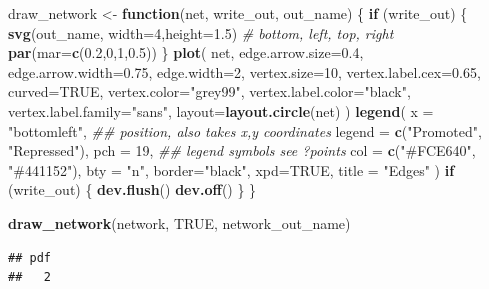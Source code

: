 \documentclass[
]{book}
\newenvironment{Shaded}{\begin{snugshade}}{\end{snugshade}}
\newcommand{\CommentTok}[1]{\textcolor[rgb]{0.56,0.35,0.01}{\textit{#1}}}
\newcommand{\ControlFlowTok}[1]{\textcolor[rgb]{0.13,0.29,0.53}{\textbf{#1}}}
\newcommand{\DataTypeTok}[1]{\textcolor[rgb]{0.13,0.29,0.53}{#1}}
\newcommand{\DecValTok}[1]{\textcolor[rgb]{0.00,0.00,0.81}{#1}}
\newcommand{\FloatTok}[1]{\textcolor[rgb]{0.00,0.00,0.81}{#1}}
\newcommand{\KeywordTok}[1]{\textcolor[rgb]{0.13,0.29,0.53}{\textbf{#1}}}
\newcommand{\NormalTok}[1]{#1}
\newcommand{\OtherTok}[1]{\textcolor[rgb]{0.56,0.35,0.01}{#1}}
\newcommand{\StringTok}[1]{\textcolor[rgb]{0.31,0.60,0.02}{#1}}
\begin{document}
\begin{Shaded}
\begin{Highlighting}[]
\NormalTok{draw\_network \textless{}{-}}\StringTok{ }\ControlFlowTok{function}\NormalTok{(net, write\_out, out\_name) \{}
  \ControlFlowTok{if}\NormalTok{ (write\_out) \{}
    \KeywordTok{svg}\NormalTok{(out\_name, }\DataTypeTok{width=}\DecValTok{4}\NormalTok{,}\DataTypeTok{height=}\FloatTok{1.5}\NormalTok{)}
    \CommentTok{\# bottom, left, top, right}
    \KeywordTok{par}\NormalTok{(}\DataTypeTok{mar=}\KeywordTok{c}\NormalTok{(}\FloatTok{0.2}\NormalTok{,}\DecValTok{0}\NormalTok{,}\DecValTok{1}\NormalTok{,}\FloatTok{0.5}\NormalTok{))}
\NormalTok{  \}}
  \KeywordTok{plot}\NormalTok{(}
\NormalTok{    net,}
    \DataTypeTok{edge.arrow.size=}\FloatTok{0.4}\NormalTok{,}
    \DataTypeTok{edge.arrow.width=}\FloatTok{0.75}\NormalTok{,}
    \DataTypeTok{edge.width=}\DecValTok{2}\NormalTok{,}
    \DataTypeTok{vertex.size=}\DecValTok{10}\NormalTok{,}
    \DataTypeTok{vertex.label.cex=}\FloatTok{0.65}\NormalTok{,}
    \DataTypeTok{curved=}\OtherTok{TRUE}\NormalTok{,}
    \DataTypeTok{vertex.color=}\StringTok{"grey99"}\NormalTok{,}
    \DataTypeTok{vertex.label.color=}\StringTok{"black"}\NormalTok{,}
    \DataTypeTok{vertex.label.family=}\StringTok{"sans"}\NormalTok{,}
    \DataTypeTok{layout=}\KeywordTok{layout.circle}\NormalTok{(net)}
\NormalTok{  )}
  \KeywordTok{legend}\NormalTok{(}
    \DataTypeTok{x =} \StringTok{"bottomleft"}\NormalTok{,      }\CommentTok{\#\# position, also takes x,y coordinates}
    \DataTypeTok{legend =} \KeywordTok{c}\NormalTok{(}\StringTok{"Promoted"}\NormalTok{, }\StringTok{"Repressed"}\NormalTok{),}
    \DataTypeTok{pch =} \DecValTok{19}\NormalTok{,              }\CommentTok{\#\# legend symbols see ?points}
    \DataTypeTok{col =} \KeywordTok{c}\NormalTok{(}\StringTok{"\#FCE640"}\NormalTok{, }\StringTok{"\#441152"}\NormalTok{),}
    \DataTypeTok{bty =} \StringTok{"n"}\NormalTok{,}
    \DataTypeTok{border=}\StringTok{"black"}\NormalTok{,}
    \DataTypeTok{xpd=}\OtherTok{TRUE}\NormalTok{,}
    \DataTypeTok{title =} \StringTok{"Edges"}
\NormalTok{  )}
  \ControlFlowTok{if}\NormalTok{ (write\_out) \{}
    \KeywordTok{dev.flush}\NormalTok{()}
    \KeywordTok{dev.off}\NormalTok{()}
\NormalTok{  \}}
\NormalTok{\}}

\KeywordTok{draw\_network}\NormalTok{(network, }\OtherTok{TRUE}\NormalTok{, network\_out\_name)}
\end{Highlighting}
\end{Shaded}

\begin{verbatim}
## pdf 
##   2
\end{verbatim}
\end{document}
